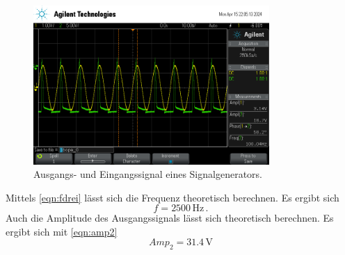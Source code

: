 \begin{figure}
    \centering
    \includegraphics[width=0.8\textwidth]{genDrei.png}
    \caption{Ausgangs- und Eingangssignal eines Signalgenerators.}
    \label{fig:genDrei}
\end{figure}
Mittels \autoref{eqn:fdrei} lässt sich die Frequenz theoretisch berechnen. Es ergibt sich
\begin{equation*}
    f = 2500 \,\unit{\hertz} \, .
\end{equation*}
Auch die Amplitude des Ausgangssignals lässt sich theoretisch berechnen. Es ergibt sich mit \autoref{eqn:amp2}
\begin{equation*}
    Amp_2 = 31.4 \,\unit{\volt}
\end{equation*}

